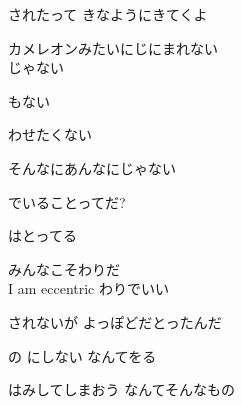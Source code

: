 されたって きなようにきてくよ

カメレオンみたいにじにまれない
\\

じゃない

もない

わせたくない

そんなにあんなにじゃない

でいることってだ?

はとってる

みんなこそわりだ
\\

I am eccentric わりでいい

されないが よっぽどだとったんだ

の にしない なんてをる

はみしてしまおう なんてそんなもの
\\
